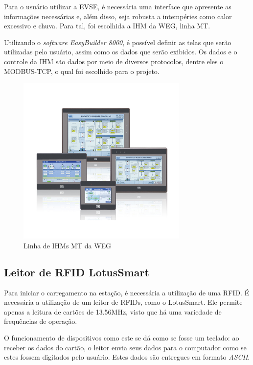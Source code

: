 Para o usuário utilizar a EVSE, é necessária uma interface que apresente as informações necessárias e, além disso, seja robusta a intempéries como calor excessivo e chuva. Para tal, foi escolhida a \ac{IHM} da WEG, linha MT.

Utilizando o \textit{software EasyBuilder 8000}, é possível definir as telas que serão utilizadas pelo usuário, assim como os dados que serão exibidos. Os dados e o controle da IHM são dados por meio de diversos protocolos, dentre eles o MODBUS-TCP, o qual foi escolhido para o projeto.

\begin{figure}[H]
        \begin{center}
                \includegraphics[width=0.75\textwidth,natwidth=400,natheight=288]{assets/images/devices-hmi.jpg}
                \caption{Linha de IHMs MT da WEG}
                \label{fig:ihm}
        \end{center}
\end{figure}

\subsection{Leitor de RFID LotusSmart}

Para iniciar o carregamento na estação, é necessária a utilização de uma \ac{RFID}. É necessária a utilização de um leitor de RFIDs, como o LotusSmart. Ele permite apenas a leitura de cartões de 13.56MHz, visto que há uma variedade de frequências de operação.

O funcionamento de dispositivos como este se dá como se fosse um teclado: ao receber os dados do cartão, o leitor envia seus dados para o computador como se estes fossem digitados pelo usuário. Estes dados são entregues em formato \textit{ASCII}.

